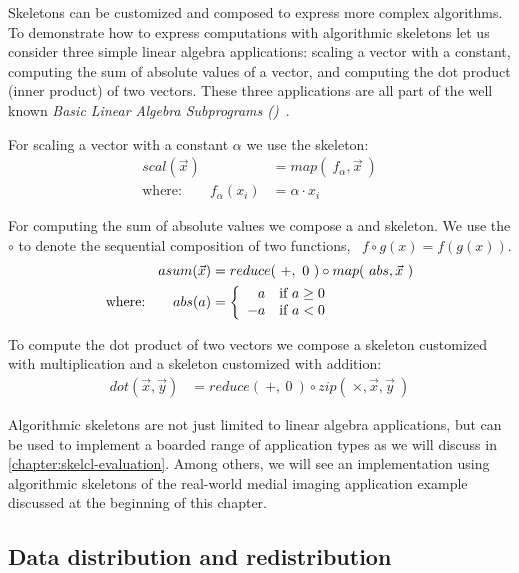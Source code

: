Skeletons can be customized and composed to express more complex algorithms.
To demonstrate how to express computations with algorithmic skeletons let us consider three simple linear algebra applications:
scaling a vector with a constant, computing the sum of absolute values of a vector, and computing the dot product (\aka inner product) of two vectors.
These three applications are all part of the well known \emph{Basic Linear Algebra Subprograms (\BLAS)}~\cite{Dongarra2002,Dongarra2002a}.

For scaling a vector with a constant $\alpha$ we use the \map skeleton:
\begin{align*}
  scal(\vec{x}) &= map(\ f_{\alpha}, \vec{x}\ )\\
  \text{where:} \qquad f_{\alpha}(x_i) &= \alpha \cdot x_i
\end{align*}

\noindent
For computing the sum of absolute values we compose a \map and \reduce skeleton.
We use the $\circ$ to denote the sequential composition of two functions, \ie\ $f \circ g(x) = f(g(x))$.
\begin{align*}
  asum(\vec{x}) &= reduce(\ +,\ 0\ ) \circ map(\ abs, \vec{x}\ )\\
  \text{where:} \qquad abs(a) &=
    \left\{
      \begin{array}{r l}
      a & \text{if } a \geq 0\\
      -a & \text{if } a < 0
      \end{array}
    \right.
\end{align*}

\noindent
To compute the dot product of two vectors we compose a \zip skeleton customized with multiplication and a \reduce skeleton customized with addition:
\begin{align*}
  dot(\vec{x}, \vec{y}) &= reduce(\ +,\ 0\ ) \circ zip(\ \times, \vec{x}, \vec{y}\ )
\end{align*}

\noindent
Algorithmic skeletons are not just limited to linear algebra applications, but can be used to implement a boarded range of application types as we will discuss in \autoref{chapter:skelcl-evaluation}.
Among others, we will see an implementation using algorithmic skeletons of the real-world medial imaging application example discussed at the beginning of this chapter.


\subsection{Data distribution and redistribution}
\label{section:skelcl-programming-model:distribution}

